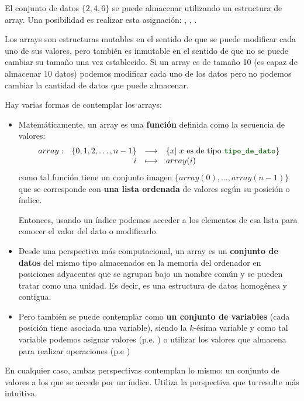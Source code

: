 \begin{example}{}
El conjunto de datos $\{2,4,6\}$ se puede almacenar  utilizando un estructura de array. Una posibilidad es realizar esta asignación:   , , .
\end{example}

Los arrays son estructuras mutables en el sentido de que se puede modificar cada uno de sus valores, pero también es inmutable en el sentido de que no se puede cambiar su tamaño una vez establecido. Si un array es de tamaño 10 (es capaz de almacenar 10 datos) podemos modificar cada uno de los datos pero no podemos cambiar la cantidad de datos que puede almacenar.


Hay varias formas de contemplar los arrays:

\begin{itemize}
\item Matemáticamente, un array es una \textbf{función} definida como la secuencia de valores:
$$
\begin{array}{crcl}
array: & \{0,1,2,\ldots,n-1\}  & \longrightarrow & \{x|\; x\mbox{ es de tipo \cm{tipo\_de\_dato}}\} \\
 & i & \longmapsto & array(i) 
\end{array}
$$
como tal función tiene un conjunto imagen $\{array(0), \ldots, array(n-1)\}$ que se corresponde con {\bf una lista ordenada} de valores según su posición o índice. 

Entonces, usando un índice podemos acceder a los elementos de esa lista para conocer el valor del dato o modificarlo. 

\item Desde una perspectiva más computacional, un {array} es un \textbf{conjunto de datos} del mismo tipo almacenados en la memoria del ordenador en posiciones adyacentes que se agrupan bajo un nombre común y se pueden tratar como una unidad. Es decir, es una estructura de datos homogénea y contigua. 

\item Pero también se puede contemplar como  {\bf un conjunto de variables} (cada posición tiene asociada una variable), siendo   la $k$-ésima variable y como tal variable podemos asignar valores (p.e.  ) o utilizar los valores que almacena para realizar operaciones (p.e ) 

\end{itemize}

En cualquier caso, ambas perspectivas contemplan lo mismo: un conjunto de valores a los que se accede por un índice. Utiliza la perspectiva que tu resulte más intuitiva.



